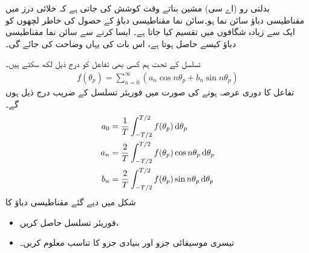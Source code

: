 بدلتی رو (اے سی) مشین بناتے وقت  کوشش کی جاتی ہے کہ خلائی درز میں مقناطیسی دباؤ سائن نما ہو۔سائن نما مقناطیسی دباؤ کے حصول  کی خاطر لچھوں کو ایک سے زیادہ شگافوں میں تقسیم کیا جاتا ہے۔ ایسا کرنے سے سائن نما مقناطیسی دباؤ کیسے حاصل ہوتا ہے، اس بات کی  یہاں وضاحت کی جائے گی۔

 تسلسل کے تحت ہم کسی بھی تفاعل   کو درج ذیل  لکھ سکتے ہیں۔
\begin{align}
f(\theta_p)=\sum_{n=0}^{\infty} (a_n \cos n \theta_p +b_n \sin n \theta_p)
\end{align}
تفاعل کا دوری عرصہ  ہونے کی صورت میں فوریئر تسلسل کے  ضریب  درج ذیل ہوں گے۔
\begin{gather}
\begin{aligned}\label{مساوات_گھومتے_مشین_فورئر_تسلسل_جزو}
a_0&=\frac{1}{T} \int_{-T/2}^{T/2} f(\theta_p) \dif \theta_p\\
a_n&=\frac{2}{T} \int_{-T/2}^{T/2} f(\theta_p) \cos n \theta_p \dif \theta_p\\
b_n&=\frac{2}{T} \int_{-T/2}^{T/2} f(\theta_p) \sin n \theta_p \dif \theta_p
\end{aligned}
\end{gather}
%
شکل   میں دیے گئے مقناطیسی دباؤ کا
\begin{itemize}
\item
فوریئر تسلسل حاصل کریں،
\item
تیسری موسیقائی جزو اور بنیادی جزو کا تناسب معلوم کریں۔
\end{itemize}

